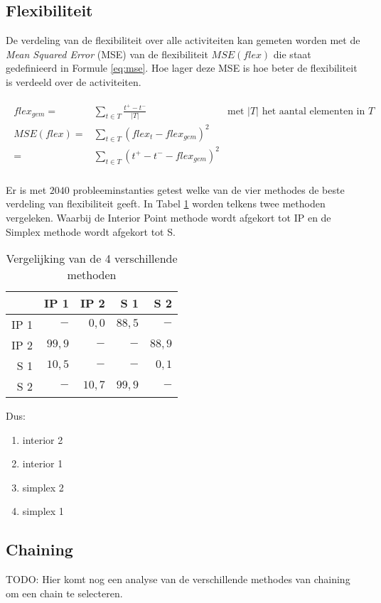\subsection{Flexibiliteit}
De verdeling van de flexibiliteit over alle activiteiten kan gemeten worden met de \emph{Mean Squared Error} (MSE) van de flexibiliteit $MSE(flex)$ die staat gedefinieerd in Formule \ref{eq:mse}. Hoe lager deze MSE is hoe beter de flexibiliteit is verdeeld over de activiteiten.

\begin{align}
\label{eq:mse}
\begin{aligned}
    flex_{gem} =& \sum_{t \in T} \frac{t^+ - t^-}{|T|}      & \text{met } |T| \text{ het aantal elementen in } T\\
    MSE(flex) =& \sum_{t \in T} (flex_t - flex_{gem})^2     & \\
               =& \sum_{t \in T} (t^+ - t^- - flex_{gem})^2 & \\
\end{aligned}
\end{align}

Er is met $2040$ probleeminstanties getest welke van de vier methodes de beste verdeling van flexibiliteit geeft. In Tabel \ref{tbl:performanceflex} worden telkens twee methoden vergeleken. Waarbij de Interior Point methode wordt afgekort tot IP en de Simplex methode wordt afgekort tot S. 

\begin{table}[H]
    \centering
    \begin{tabular}{| r | r | r | r | r |}
        \hline
            & IP 1 & IP 2 & S 1 & S 2 \\
        \hline
        IP 1 & $-$ & $0,0$ & $88,5$ & $-$ \\
        IP 2 & $99,9$ & $-$ & $-$ & $88,9$ \\ 
        S 1  & $10,5$ & $-$ & $-$ & $0,1$ \\
        S 2  & $-$ & $10,7$ & $99,9$ & $-$ \\
        \hline
    \end{tabular}
    \caption{Vergelijking van de 4 verschillende methoden}
    \label{tbl:performanceflex}
\end{table}

Dus:
\begin{enumerate}
    \item interior 2
    \item interior 1
    \item simplex 2
    \item simplex 1
\end{enumerate}

\subsection{Chaining}
TODO: Hier komt nog een analyse van de verschillende methodes van chaining om een chain te selecteren. 
